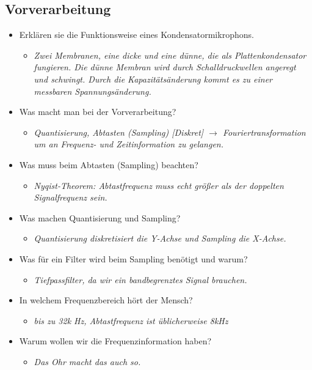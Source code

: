 \documentclass[11pt]{article}
\begin{document}
\subsection{Vorverarbeitung}
\begin{itemize}
\item Erklären sie die Funktionsweise eines Kondensatormikrophons.
\begin{itemize}
\item \emph{Zwei Membranen, eine dicke und eine dünne, die als Plattenkondensator fungieren. Die dünne Membran wird durch Schalldruckwellen angeregt und schwingt. Durch die Kapazitätsänderung kommt es zu einer messbaren Spannungsänderung.}
\end{itemize}
\item Was macht man bei der Vorverarbeitung?
\begin{itemize}
\item \emph{Quantisierung, Abtasten (Sampling) [Diskret] $\rightarrow$ Fouriertransformation um an Frequenz- und Zeitinformation zu gelangen.} 
\end{itemize}
\item Was muss beim Abtasten (Sampling) beachten?
\begin{itemize}
\item \emph{Nyqist-Theorem: Abtastfrequenz muss echt größer als der doppelten Signalfrequenz sein.}
\end{itemize}
\item Was machen Quantisierung und Sampling?
\begin{itemize}
\item \emph{Quantisierung diskretisiert die Y-Achse und Sampling die X-Achse.}
\end{itemize}
\item Was für ein Filter wird beim Sampling benötigt und warum?
\begin{itemize}
\item \emph{Tiefpassfilter, da wir ein bandbegrenztes Signal brauchen.}
\end{itemize}
\item In welchem Frequenzbereich hört der Mensch?
\begin{itemize}
\item \emph{bis zu 32k Hz, Abtastfrequenz ist üblicherweise 8kHz}
\end{itemize}
\item Warum wollen wir die Frequenzinformation haben?
\begin{itemize}
\item \emph{Das Ohr macht das auch so.}

\end{itemize}
\end{itemize}
\end{document}
